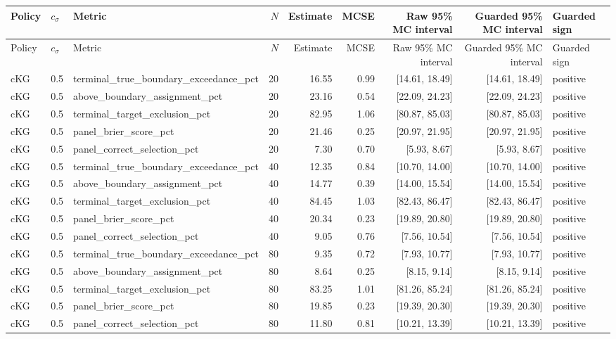 \begin{longtable}{lllrrrrrl}
\toprule
Policy & $c_\sigma$ & Metric & $N$ & Estimate & MCSE & Raw 95\% MC interval & Guarded 95\% MC interval & Guarded sign \\
\midrule
\endfirsthead
\toprule
Policy & $c_\sigma$ & Metric & $N$ & Estimate & MCSE & Raw 95\% MC interval & Guarded 95\% MC interval & Guarded sign \\
\midrule
\endhead
cKG & 0.5 & terminal\_true\_boundary\_exceedance\_pct & 20 & 16.55 & 0.99 & [14.61, 18.49] & [14.61, 18.49] & positive \\
cKG & 0.5 & above\_boundary\_assignment\_pct & 20 & 23.16 & 0.54 & [22.09, 24.23] & [22.09, 24.23] & positive \\
cKG & 0.5 & terminal\_target\_exclusion\_pct & 20 & 82.95 & 1.06 & [80.87, 85.03] & [80.87, 85.03] & positive \\
cKG & 0.5 & panel\_brier\_score\_pct & 20 & 21.46 & 0.25 & [20.97, 21.95] & [20.97, 21.95] & positive \\
cKG & 0.5 & panel\_correct\_selection\_pct & 20 & 7.30 & 0.70 & [5.93, 8.67] & [5.93, 8.67] & positive \\
cKG & 0.5 & terminal\_true\_boundary\_exceedance\_pct & 40 & 12.35 & 0.84 & [10.70, 14.00] & [10.70, 14.00] & positive \\
cKG & 0.5 & above\_boundary\_assignment\_pct & 40 & 14.77 & 0.39 & [14.00, 15.54] & [14.00, 15.54] & positive \\
cKG & 0.5 & terminal\_target\_exclusion\_pct & 40 & 84.45 & 1.03 & [82.43, 86.47] & [82.43, 86.47] & positive \\
cKG & 0.5 & panel\_brier\_score\_pct & 40 & 20.34 & 0.23 & [19.89, 20.80] & [19.89, 20.80] & positive \\
cKG & 0.5 & panel\_correct\_selection\_pct & 40 & 9.05 & 0.76 & [7.56, 10.54] & [7.56, 10.54] & positive \\
cKG & 0.5 & terminal\_true\_boundary\_exceedance\_pct & 80 & 9.35 & 0.72 & [7.93, 10.77] & [7.93, 10.77] & positive \\
cKG & 0.5 & above\_boundary\_assignment\_pct & 80 & 8.64 & 0.25 & [8.15, 9.14] & [8.15, 9.14] & positive \\
cKG & 0.5 & terminal\_target\_exclusion\_pct & 80 & 83.25 & 1.01 & [81.26, 85.24] & [81.26, 85.24] & positive \\
cKG & 0.5 & panel\_brier\_score\_pct & 80 & 19.85 & 0.23 & [19.39, 20.30] & [19.39, 20.30] & positive \\
cKG & 0.5 & panel\_correct\_selection\_pct & 80 & 11.80 & 0.81 & [10.21, 13.39] & [10.21, 13.39] & positive \\

\end{longtable}
